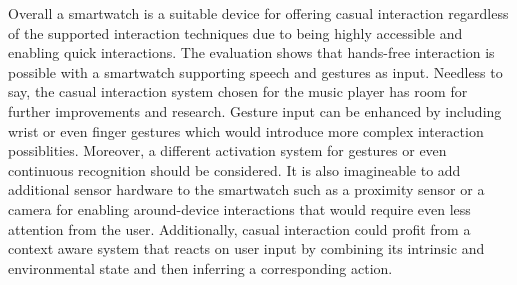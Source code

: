 Overall a smartwatch is a suitable device for offering casual interaction regardless of the supported interaction techniques due to being highly accessible and enabling quick interactions. The evaluation shows that hands-free interaction is possible with a smartwatch supporting speech and gestures as input. Needless to say, the casual interaction system chosen for the music player has room for further improvements and research. Gesture input can be enhanced by including wrist or even finger gestures which would introduce more complex interaction possiblities. Moreover, a different activation system for gestures or even continuous recognition should be considered. It is also imagineable to add additional sensor hardware to the smartwatch such as a proximity sensor or a camera for enabling around-device interactions that would require even less attention from the user. Additionally, casual interaction could profit from a context aware system that reacts on user input by combining its intrinsic and environmental state and then inferring a corresponding action.








